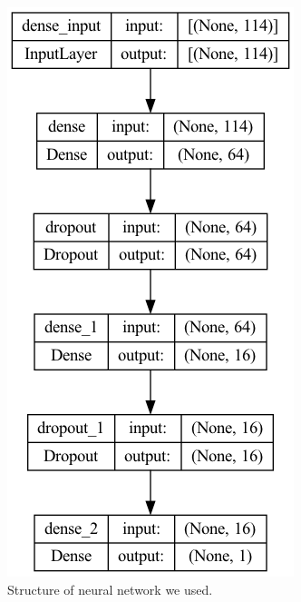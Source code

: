 \documentclass[11pt, a4paper, jou]{apa7}
\begin{document}
\begin{figure}[p]
    \centering
    \caption{Structure of neural network we used. }\label{fig:nn}
    \includegraphics[width=.35\textwidth]{figures/Network_structure.png}
\end{figure}
\end{document}
